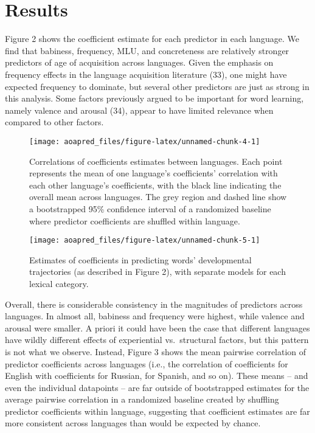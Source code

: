 \documentclass[english,man]{apa6}
\theoremstyle{definition}
\theoremstyle{definition}
\theoremstyle{definition}
\theoremstyle{remark}
\begin{document}
\section*{Results}\label{results}

Figure 2 shows the coefficient estimate for each predictor in each
language. We find that babiness, frequency, MLU, and concreteness are
relatively stronger predictors of age of acquisition across languages.
Given the emphasis on frequency effects in the language acquisition
literature (33), one might have expected frequency to dominate, but
several other predictors are just as strong in this analysis. Some
factors previously argued to be important for word learning, namely
valence and arousal (34), appear to have limited relevance when compared
to other factors.

\begin{figure}

{\centering \texttt{[image: aoapred\_files/figure-latex/unnamed-chunk-4-1]} 

}

\caption{Correlations of coefficients estimates between languages. Each point represents the mean of one language's coefficients' correlation with each other language's coefficients, with the black line indicating the overall mean across languages. The grey region and dashed line show a bootstrapped 95\% confidence interval of a randomized baseline where predictor coefficients are shuffled within language.}\label{fig:unnamed-chunk-4}
\end{figure}

\begin{figure*}

{\centering \texttt{[image: aoapred\_files/figure-latex/unnamed-chunk-5-1]} 

}

\caption{Estimates of coefficients in predicting words' developmental trajectories (as described in Figure 2), with separate models for each lexical category.}\label{fig:unnamed-chunk-5}
\end{figure*}

Overall, there is considerable consistency in the magnitudes of
predictors across languages. In almost all, babiness and frequency were
highest, while valence and arousal were smaller. A priori it could have
been the case that different languages have wildly different effects of
experiential vs.~structural factors, but this pattern is not what we
observe. Instead, Figure 3 shows the mean pairwise correlation of
predictor coefficients across languages (i.e., the correlation of
coefficients for English with coefficients for Russian, for Spanish, and
so on). These means -- and even the individual datapoints -- are far
outside of bootstrapped estimates for the average pairwise correlation
in a randomized baseline created by shuffling predictor coefficients
within language, suggesting that coefficient estimates are far more
consistent across languages than would be expected by chance.
\end{document}
